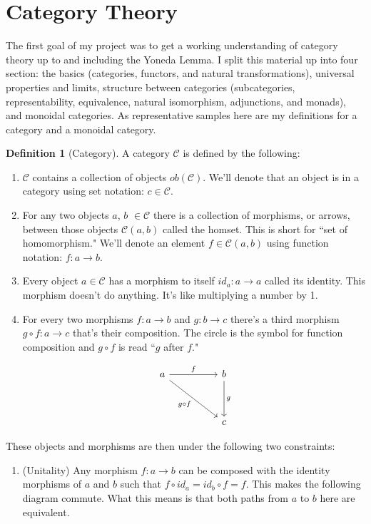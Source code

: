 \documentclass{article}
\theoremstyle{definition}
\newtheorem{definition}{Definition}
\begin{document}
\section*{Category Theory}
The first goal of my project was to get a working understanding of category theory up to and including the Yoneda Lemma.
I split this material up into four section: the basics (categories, functors, and natural transformations), universal properties and limits, structure between categories (subcategories, representability, equivalence, natural isomorphism, adjunctions, and monads), and monoidal categories.
As representative samples here are my definitions for a category and a monoidal category.
\pagebreak
\begin{definition}[Category]
    A category $\mathcal{C}$ is defined by the following:
    \begin{enumerate}
        \item $\mathcal{C}$ contains a collection of objects $ob(\mathcal{C})$. We'll denote that an object is in a category using set notation: $c\in\mathcal{C}$.
        \item For any two objects $a$, $b$ $\in \mathcal{C}$ there is a collection of morphisms, or arrows, between those objects $\mathcal{C}(a,b)$ called the homset. This is short for ``set of homomorphism." We'll denote an element $f\in\mathcal{C}(a,b)$ using function notation: $f:a\rightarrow b$.
        \item Every object $a\in \mathcal{C}$ has a morphism to itself $id_a:a\rightarrow a$ called its identity. This morphism doesn't do anything. It's like multiplying a number by 1.
        \item For every two morphisms $f:a\rightarrow b$ and $g: b\rightarrow c$ there's a third morphism $g\circ f:a\rightarrow c$ that's their composition. The circle is the symbol for function composition and $g \circ f$ is read ``$g$ after $f$."

              \[\begin{tikzcd}
                      a && b \\
                      \\
                      && c
                      \arrow["f", from=1-1, to=1-3]
                      \arrow["g", from=1-3, to=3-3]
                      \arrow["{g\circ f}"', from=1-1, to=3-3]
                  \end{tikzcd}\]

    \end{enumerate}
    These objects and morphisms are then under the following two constraints:
    \begin{enumerate}
        \item (Unitality) Any morphism $f:a\rightarrow b$ can be composed with the identity morphisms of $a$ and $b$ such that $f\circ id_a=id_b\circ f=f$. This makes the following diagram commute. What this means is that both paths from $a$ to $b$ here are equivalent.


\end{enumerate}
\end{definition}
\end{document}
